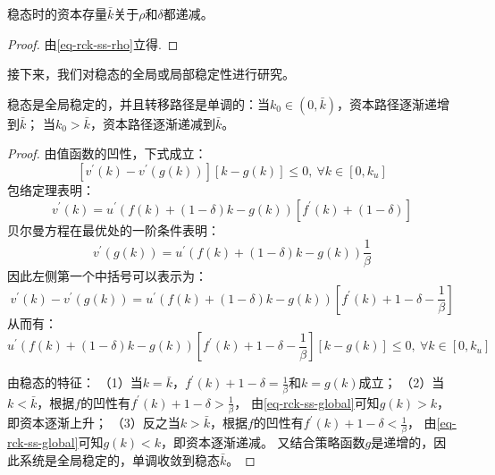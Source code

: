 \begin{property}
    稳态时的资本存量$\bar{k}$关于$\rho$和$\delta$都递减。
\end{property}
\begin{proof}
    由\cref{eq-rck-ss-rho}立得.
\end{proof}

接下来，我们对稳态的全局或局部稳定性进行研究。
\begin{theorem}[全局稳定性]
    稳态是全局稳定的，并且转移路径是单调的：当$k_0\in (0, \bar{k})$，资本路径逐渐递增到$\bar{k}$；
    当$k_0>\bar{k}$，资本路径逐渐递减到$\bar{k}$。
\end{theorem}
\begin{proof}
    由值函数的凹性，下式成立：
    \begin{equation*}
        \left[v^{\prime}(k)-v^{\prime}(g(k))\right][k-g(k)] \leq 0,~ \forall k \in\left[0, k_u\right]
    \end{equation*}
    包络定理表明：
    \begin{equation*}
        v^{\prime}(k) = u^{\prime}\left(f(k)+(1-\delta) k-g(k)\right) \left[f^{\prime}(k)+(1-\delta)\right]
    \end{equation*}
    贝尔曼方程在最优处的一阶条件表明：
    \begin{equation*}
        v^{\prime}(g(k)) = u^{\prime}\left(f(k)+(1-\delta) k-g(k)\right)\frac{1}{\beta}
    \end{equation*}
    因此左侧第一个中括号可以表示为：
    \begin{equation*}
        v^{\prime}(k)-v^{\prime}(g(k)) = 
            u^{\prime}\left(f(k)+(1-\delta)k-g(k)\right)\left[f^{\prime}(k)+1-\delta-\frac{1}{\beta}\right]
    \end{equation*}
    从而有：
    \begin{equation}    \label{eq-rck-ss-global}
        u^{\prime}\left(f(k)+(1-\delta)k-g(k)\right)\left[f^{\prime}(k)+1-\delta-\frac{1}{\beta}\right]
            \left[k-g(k)\right] \leq 0,~ \forall k \in\left[0, k_u\right]
    \end{equation}

    由稳态的特征：
    （1）当$k=\bar{k}$，$f^{\prime}(k)+1-\delta=\frac{1}{\beta}$和$k=g(k)$成立；
    （2）当$k<\bar{k}$，根据$f$的凹性有$f^{\prime}(k)+1-\delta>\frac{1}{\beta}$，
    由\cref{eq-rck-ss-global}可知$g(k)>k$，即资本逐渐上升；
    （3）反之当$k>\bar{k}$，根据$f$的凹性有$f^{\prime}(k)+1-\delta<\frac{1}{\beta}$，
    由\cref{eq-rck-ss-global}可知$g(k)<k$，即资本逐渐递减。
    又结合策略函数$g$是递增的，因此系统是全局稳定的，单调收敛到稳态$\bar{k}$。
\end{proof}
